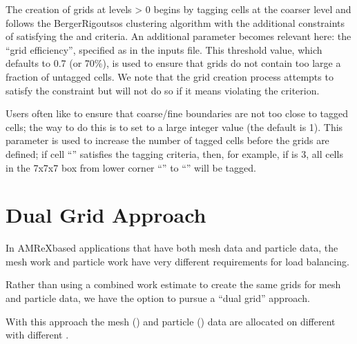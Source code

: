 \documentclass[letterpaper,10pt,english]{sphinxmanual}
\begin{document}
\sphinxAtStartPar
The creation of grids at levels \textgreater{} 0 begins by tagging cells at the coarser level and follows
the Berger\sphinxhyphen{}Rigoutsos clustering algorithm with the additional constraints of satisfying
the  and  criteria.  An additional parameter
becomes relevant here: the “grid efficiency”, specified as  in the inputs file.
This threshold value, which defaults to 0.7 (or 70\%), is used to ensure that
grids do not contain too large a fraction of un\sphinxhyphen{}tagged cells.   We note that the grid creation
process attempts to satisfy the  constraint but will not do so if it means
violating the  criterion.

\sphinxAtStartPar
Users often like to ensure that coarse/fine boundaries are not too close to tagged cells; the
way to do this is to set  to a large integer value (the default is 1).
This parameter is used to increase the number of tagged cells before the grids are defined;
if cell “” satisfies the tagging criteria, then, for example, if  is 3,
all cells in the 7x7x7 box from lower corner “” to “” will be tagged.


\section{Dual Grid Approach}
\label{\detokenize{DualGrid:dual-grid-approach}}\label{\detokenize{DualGrid:sec-dual-grid}}\label{\detokenize{DualGrid::doc}}
\sphinxAtStartPar
In AMReX\sphinxhyphen{}based applications that have both mesh data and particle data,
the mesh work and particle work have very different requirements for load balancing.

\sphinxAtStartPar
Rather than using a combined work estimate to create the same grids for mesh and particle
data, we have the option to pursue a “dual grid” approach.

\sphinxAtStartPar
With this approach the mesh () and particle () data
are allocated on different  with different .
\end{document}
